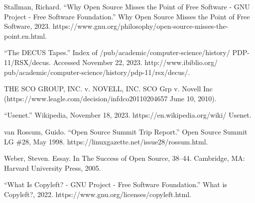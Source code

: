 \documentclass{article}
\begin{document}
Stallman, Richard. “Why Open Source Misses the Point of Free Software - GNU Project - Free Software Foundation.” Why
Open Source Misses the Point of Free Software, 2023.
https://www.gnu.org/philosophy/open-source-misses-the-point.en.html. 

“The DECUS Tapes.” Index of /pub/academic/computer-science/history/ PDP-11/RSX/decus. Accessed November 22, 2023.
http://www.ibiblio.org/ pub/academic/computer-science/history/pdp-11/rsx/decus/. 

THE SCO GROUP, INC. v. NOVELL, INC. SCO Grp v. Novell Inc (https://www.leagle.com/decision/infdco20110204657 June 10,
2010). 

“Usenet.” Wikipedia, November 18, 2023. https://en.wikipedia.org/wiki/ Usenet. 

van Rossum, Guido. “Open Source Summit Trip Report.” Open Source Summit LG \#28, May 1998.
https://linuxgazette.net/issue28/rossum.html. 

Weber, Steven. Essay. In The Success of Open Source, 38–44. Cambridge, MA: Harvard University Press, 2005. 

“What Is Copyleft? - GNU Project - Free Software Foundation.” What is Copyleft?, 2022.
https://www.gnu.org/licenses/copyleft.html. 


\bigskip


\bigskip
\end{document}
